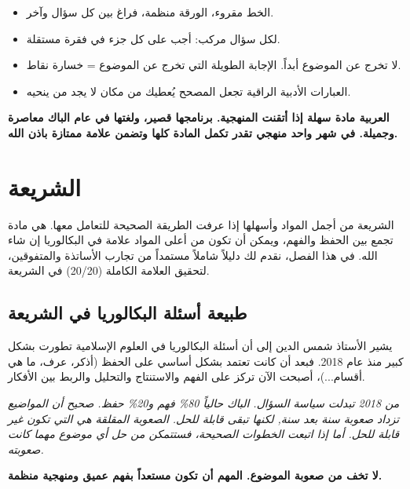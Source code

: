 \documentclass[12pt,a4paper]{book}
\newcommand{\quoteAr}[1]{%
	\begin{myquote}
		\itshape #1
	\end{myquote}
}
\newcommand{\importantAr}[1]{%
	\begin{important}
		\bfseries #1
	\end{important}
}
\begin{document}
	\begin{itemize}
		\item الخط مقروء، الورقة منظمة، فراغ بين كل سؤال وآخر.
		\item لكل سؤال مركب: أجب على كل جزء في فقرة مستقلة.
		\item لا تخرج عن الموضوع أبداً. الإجابة الطويلة التي تخرج عن الموضوع = خسارة نقاط.
		\item العبارات الأدبية الراقية تجعل المصحح يُعطيك من مكان لا يجد من ينحيه.
	\end{itemize}
	
	\importantAr{العربية مادة سهلة إذا أتقنت المنهجية. برنامجها قصير، ولغتها في عام الباك معاصرة وجميلة. في شهر واحد منهجي تقدر تكمل المادة كلها وتضمن علامة ممتازة باذن الله.}
	
	
	\section{الشريعة}
	
	الشريعة من أجمل المواد وأسهلها إذا عرفت الطريقة الصحيحة للتعامل معها. هي مادة تجمع بين الحفظ والفهم، ويمكن أن تكون من أعلى المواد علامة في البكالوريا إن شاء الله. في هذا الفصل، نقدم لك دليلاً شاملاً مستمداً من تجارب الأساتذة والمتفوقين، لتحقيق العلامة الكاملة (20/20) في الشريعة.
	
	\subsection{طبيعة أسئلة البكالوريا في الشريعة}
	
	يشير الأستاذ شمس الدين إلى أن أسئلة البكالوريا في العلوم الإسلامية تطورت بشكل كبير منذ عام 2018. فبعد أن كانت تعتمد بشكل أساسي على الحفظ (أذكر، عرف، ما هي أقسام...)، أصبحت الآن تركز على الفهم والاستنتاج والتحليل والربط بين الأفكار.
	
	\quoteAr{من 2018 تبدلت سياسة السؤال. الباك حالياً 80\% فهم و20\% حفظ. صحيح أن المواضيع تزداد صعوبة سنة بعد سنة, لكنها تبقى قابلة للحل. الصعوبة المقلقة هي التي تكون غير قابلة للحل. أما إذا اتبعت الخطوات الصحيحة، فستتمكن من حل أي موضوع مهما كانت صعوبته.}
	
	\importantAr{لا تخف من صعوبة الموضوع. المهم أن تكون مستعداً بفهم عميق ومنهجية منظمة.}
	
\end{document}
